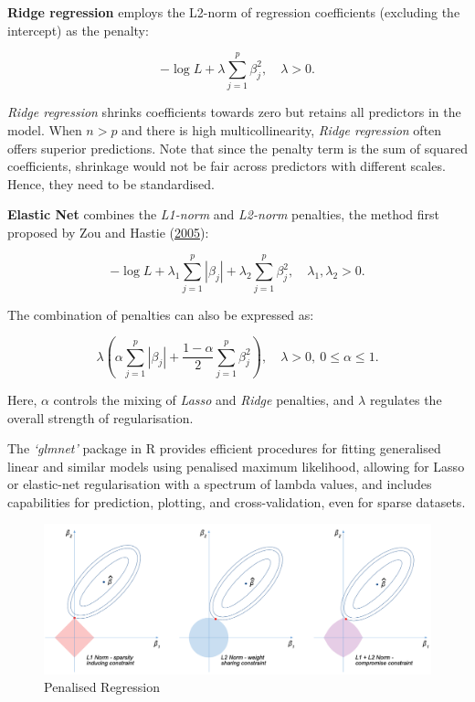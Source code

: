 \documentclass[
  11pt,
]{article}
\begin{document}
\textbf{Ridge regression} employs the L2-norm of regression coefficients
(excluding the intercept) as the penalty:

\begin{equation}
- \log L + \lambda \sum_{j=1}^{p} \beta_j^2, \quad \lambda > 0.
\end{equation}

\emph{Ridge regression} shrinks coefficients towards zero but retains
all predictors in the model. When \(n > p\) and there is high
multicollinearity, \emph{Ridge regression} often offers superior
predictions. Note that since the penalty term is the sum of squared
coefficients, shrinkage would not be fair across predictors with
different scales. Hence, they need to be standardised.

\textbf{Elastic Net} combines the \emph{L1-norm} and \emph{L2-norm}
penalties, the method first proposed by Zou and Hastie
(\protect\hyperlink{ref-Zou2005}{2005}):

\begin{equation}
- \log L + \lambda_1 \sum_{j=1}^{p} |\beta_j| + \lambda_2 \sum_{j=1}^{p} \beta_j^2, \quad \lambda_1, \lambda_2 > 0.
\end{equation}

The combination of penalties can also be expressed as:

\begin{equation}
\lambda \left( \alpha \sum_{j=1}^{p} |\beta_j| + \frac{1-\alpha}{2} \sum_{j=1}^{p} \beta_j^2 \right), \quad \lambda > 0, \ 0 \leq \alpha \leq 1.
\end{equation}

Here, \(\alpha\) controls the mixing of \emph{Lasso} and \emph{Ridge}
penalties, and \(\lambda\) regulates the overall strength of
regularisation.

The \emph{`glmnet'} package in R provides efficient procedures for
fitting generalised linear and similar models using penalised maximum
likelihood, allowing for Lasso or elastic-net regularisation with a
spectrum of lambda values, and includes capabilities for prediction,
plotting, and cross-validation, even for sparse datasets.

\begin{figure}

{\centering \includegraphics[width=1\linewidth]{reg_pen} 

}

\caption{Penalised Regression}\label{fig:penalisation graphics}
\end{figure}
\end{document}
